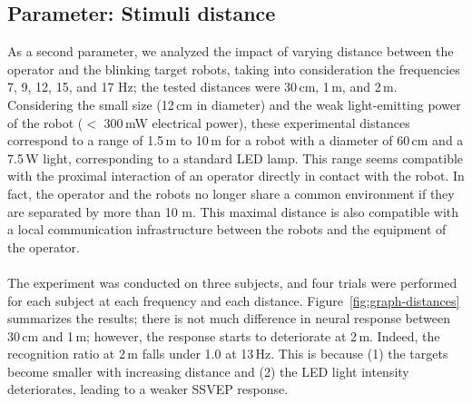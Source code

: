 \documentclass[smallextended]{svjour3}
\begin{document}
\subsection{Parameter: Stimuli distance}
As a second parameter, we analyzed the impact of varying distance between the operator and the blinking target robots, taking into consideration the frequencies 7, 9, 12, 15, and 17 Hz; the tested distances were 30\,cm, 1\,m, and 2\,m. 
Considering the small size (12\,cm in diameter) and the weak light-emitting power of the robot ($<$ 300\,mW electrical power), these experimental distances correspond to a range of 1.5\,m to 10\,m for a robot with a diameter of 60\,cm and a 7.5\,W light, corresponding to a standard LED lamp. 
This range seems compatible with the proximal interaction of an operator directly in contact with the robot. In fact, the operator and the robots no longer share a common environment if they are separated by more than 10 m. This maximal distance is also compatible with a local communication infrastructure between the robots and the equipment of the operator.\\
\\
The experiment was conducted on three subjects, and four trials were performed for each subject at each frequency and each distance.
Figure~\ref{fig:graph-distances} summarizes the results; there is not much difference in neural response between 30\,cm and 1\,m; however, the response starts to deteriorate at 2\,m. Indeed, the recognition ratio at 2\,m falls under 1.0 at 13\,Hz. 
This is because (1) the targets become smaller with increasing distance and (2) the LED light intensity deteriorates, leading to a weaker SSVEP response.
\end{document}
